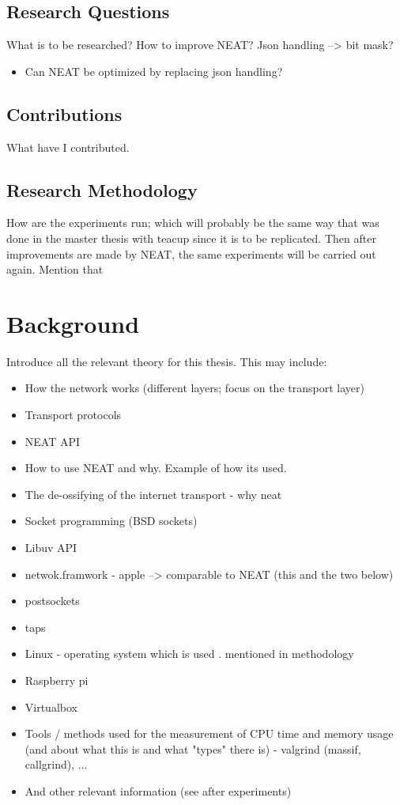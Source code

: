 \documentclass[12pt]{report}
\begin{document}
\section{Research Questions}
What is to be researched? How to improve NEAT? Json handling --> bit mask?
\begin{itemize}
\item Can NEAT be optimized by replacing json handling?
\end{itemize}

\section{Contributions}
What have I contributed.

\section{Research Methodology}
How are the experiments run; which will probably be the same way that was done in the master thesis with teacup since it is to be replicated. Then after improvements are made by NEAT, the same experiments will be carried out again. Mention that 

\chapter{Background}


Introduce all the relevant theory for this thesis. This may include:
\begin{itemize}
\item How the network works (different layers; focus on the transport layer)
\item Transport protocols
\item NEAT API
\item How to use NEAT and why. Example of how its used.
\item The de-ossifying of the internet transport - why neat
\item Socket programming (BSD sockets)
\item Libuv API
\item netwok.framwork - apple --> comparable to NEAT (this and the two below)
\item postsockets
\item taps 
\item Linux - operating system which is used . mentioned in methodology
\item Raspberry pi
\item Virtualbox
\item Tools / methods used for the measurement of CPU time and memory usage (and about what this is and what "types" there is) - valgrind (massif, callgrind), ...
\item And other relevant information (see after experiments)
\end{itemize}
\end{document}
